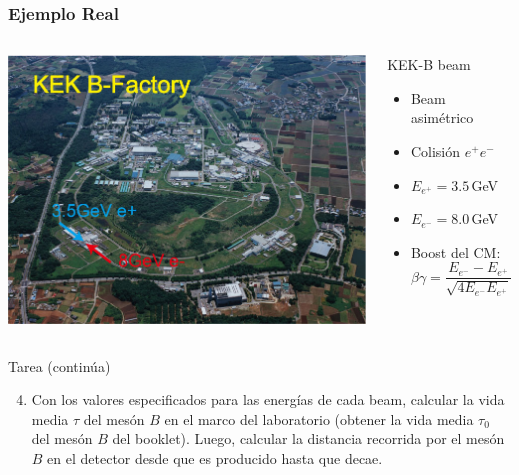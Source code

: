 \documentclass[xetex,mathserif,serif,10pt]{beamer}
\begin{document}
\begin{frame}
	\frametitle{Ejemplo Real}
  \begin{columns}
    {\centering \includegraphics[width=1.00\columnwidth]{./figs/u01/kekb.png}}
    \begin{block}{KEK-B beam}
      \begin{itemize}
        \item Beam asimétrico
        \item Colisión $e^+ e^-$
        \item $E_{e^+} = 3.5$\,GeV
        \item $E_{e^-} = 8.0$\,GeV
        \item Boost del CM:
        \[ \beta \gamma = \frac{E_{e^-} - E_{e^+}}{\sqrt{4 E_{e^-} E_{e^+}}} \]
      \end{itemize}
    \end{block}
  \end{columns}
  \begin{exampleblock}{Tarea (continúa)}
    \begin{enumerate}\setcounter{enumi}{03}
      \item Con los valores especificados para las energías de cada beam, calcular la vida media $\tau$ del mesón $B$ en el marco del laboratorio (obtener la vida media $\tau_0$ del mesón $B$ del booklet). Luego, calcular la distancia recorrida por el mesón $B$ en el detector desde que es producido hasta que decae.
    \end{enumerate}
  \end{exampleblock}
\end{frame}
\end{document}
